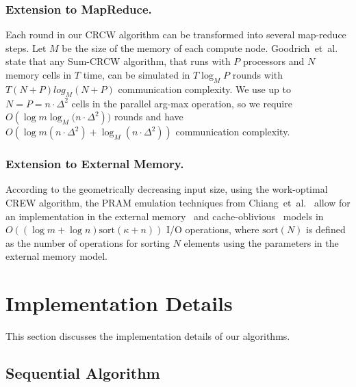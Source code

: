 \documentclass[runningheads]{llncs}
\begin{document}
\subsubsection{Extension to MapReduce.}
Each round in our CRCW algorithm can be transformed into several map-reduce steps.
Let $M$ be the size of the memory of each compute node.
Goodrich~et~al.~\cite{goodrich2011sorting} state that any Sum-CRCW algorithm,  that runs with $P$ processors and $N$ memory cells in $T$ time, can be simulated in $T\log_{M}{P}$ rounds with $T(N + P) log_{M}{(N + P)}$ communication complexity.
We use up to \hbox{$N=P=n\cdot\Delta^2$} cells in the parallel arg-max operation, so we require $O(\log{m}\log_{M}{(n\cdot \Delta^2}))$ rounds and have $O(\log{m}(n\cdot\Delta^2)+ \log_{M}{(n\cdot\Delta^2)})$ communication complexity. %


\subsubsection{Extension to External Memory.}
According to the geometrically decreasing input size, using the work-optimal CREW algorithm, the PRAM emulation techniques from Chiang~et~al.~\cite{DBLP:conf/soda/ChiangGGTVV95} allow for an implementation in the external memory~\cite{DBLP:journals/cacm/AggarwalV88} and cache-oblivious~\cite{DBLP:conf/focs/FrigoLPR99} models in $O((\log{m}+\log{n}) \mathrm{sort}({\kappa+n}))$ I/O operations, where $\mathrm{sort}(N)$ is defined as the number of operations for sorting $N$ elements using the parameters in the external memory model. %


\section{Implementation Details}\label{sec:details}
This section discusses the implementation details of our algorithms.
\subsection{Sequential Algorithm}\label{sec:details:sequential_algorithm}
\noindent
\end{document}
